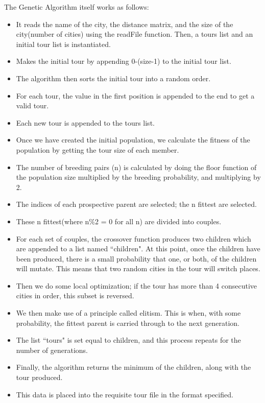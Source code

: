 \documentclass{article}
\begin{document}
The Genetic Algorithm itself works as follows:
\begin{itemize}
	\item It reads the name of the city, the distance matrix, and the size of the city(number of cities) using the readFile function. Then, a tours list and an initial tour list is instantiated.
	\item Makes the initial tour by appending 0-(size-1) to the initial tour list.
	\item The algorithm then sorts the initial tour into a random order.
	\item For each tour, the value in the first position is appended to the end to get a valid tour.
	\item Each new tour is appended to the tours list.
	\item Once we have created the initial population, we calculate the fitness of the population by getting the tour size of each member.
	\item The number of breeding pairs (n) is calculated by doing the floor function of the population size multiplied by the breeding probability, and multiplying by 2.
	\item The indices of each prospective parent are selected; the n fittest are selected.
	\item These n fittest(where n\%2 = 0 for all n) are divided into couples.
	\item For each set of couples, the crossover function produces two children which are appended to a list named ``children". At this point, once the children have been produced, there is a small probability that one, or both, of the children will mutate. This means that two random cities in the tour will switch places.
	\item Then we do some local optimization; if the tour has more than 4 consecutive cities in order, this subset is reversed.
	\item We then make use of a principle called elitism. This is when, with some probability, the fittest parent is carried through to the next generation.
	\item The list ``tours" is set equal to children, and this process repeats for the number of generations.
	\item Finally, the algorithm returns the minimum of the children, along with the tour produced.
	\item This data is placed into the requisite tour file in the format specified.
\end{itemize}
\end{document}
